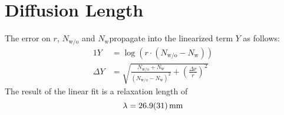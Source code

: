 \section{Diffusion Length}
The error on $r$, $N_\text{w/o}$ and $N_\text{w}$propagate into the linearized term $Y$ as follows:
\begin{alignat}{1}
	Y &= \log(r \cdot (N_\text{w/o} - N_\text{w})) \nonumber\\
	\Delta Y &= \sqrt{
		\frac{N_\text{w/o} + N_\text{w}}{(N_\text{w/o} - N_\text{w})^2} +
		\left(\frac{\Delta r}{r}\right)^2
	}
\end{alignat}
The result of the linear fit is a relaxation length of 
\begin{equation*}
	\lambda = \SI{26.9 +- 3.1}{\mm}
\end{equation*}
